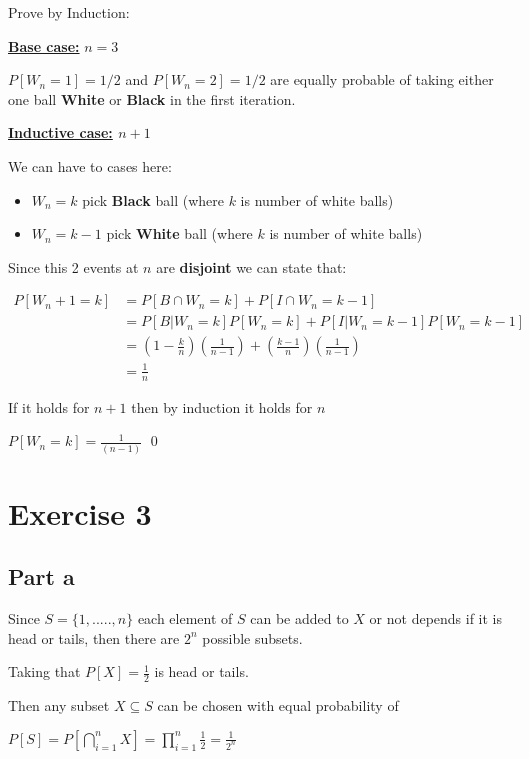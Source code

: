 \documentclass[12pt, a4paper]{article}
\begin{document}
Prove by Induction:

\textbf{\underline{Base case:}} $n = 3$

$P[W_n=1] = 1/2$ and $P[W_n=2] = 1/2$ are equally probable of taking either one ball \textbf{White} or \textbf{Black} in the first iteration.

\textbf{\underline{Inductive case:} $n + 1$}

We can have to cases here:
\begin{itemize}
  \item $W_n=k$ pick \textbf{Black} ball (where $k$ is number of white balls)
  \item $W_n=k-1$ pick \textbf{White} ball (where $k$ is number of white balls)
\end{itemize}

Since this 2 events at $n$ are \textbf{disjoint} we can state that:

\begin{center}
  \begin{align*}
    P[W_n+1=k] &= P[B \cap W_n=k] + P[I \cap W_n=k-1] \\
               &= P[B|W_n=k]P[W_n=k] + P[I|W_n=k-1]P[W_n=k-1] \\
               &= \left(1-\frac{k}{n}\right)\left(\frac{1}{n-1}\right) + \left(\frac{k-1}{n}\right)\left(\frac{1}{n-1}\right) \\
               &= \frac{1}{n}
  \end{align*}
\end{center}

If it holds for $n+1$ then by induction it holds for $n$

$P[W_n=k] = \frac{1}{(n-1)}$ \qed

\section{Exercise 3}
\subsection{Part a} \label{ex_3_part_a}

Since $S = \{1,.....,n\}$ each element of $S$ can be added to $X$ or not depends
if it is head or tails, then there are $2^n$ possible subsets.

Taking that $P[X] = \frac{1}{2}$ is head or tails.

Then any subset $X \subseteq S$ can be chosen with equal probability of

$P[S] = P[\bigcap_{i=1}^{n}X] = \displaystyle\prod_{i=1}^{n} \frac{1}{2} = \frac{1}{2^n}$
\end{document}
